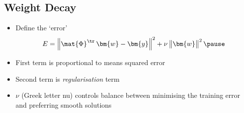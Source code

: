 \begin{slide}
\section{Weight Decay}
\begin{PauseHighLight}

\begin{itemize}
\item Define the `error'
  \begin{displaymath}
    E = \left\|\strut \mat{\Phi}^\tr \, \bm{w}-\bm{y} \right\|^2 + \nu
    \left\| \strut \bm{w} \right\|^2\pause
  \end{displaymath}
\item First term is proportional to means squared error\pause
\item Second term is \emph{regularisation} term\pause
\item $\nu$ (Greek letter nu) controls balance between minimising
the training error and preferring smooth solutions\pause
\end{itemize}

\end{PauseHighLight}
\end{slide}


